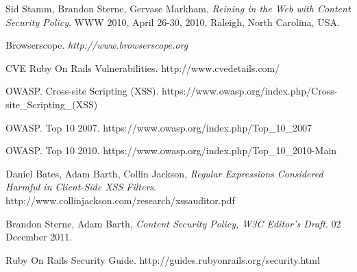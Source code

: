\documentclass[10pt, conference, compsocconf]{IEEEtran}
\begin{document}
\begin{thebibliography}{1}
Sid Stamm, Brandon Sterne, Gervase Markham, \emph{Reining in the Web with Content Security Policy}. WWW 2010, April 26-30, 2010, Raleigh, North Carolina, USA.

Browserscope. \emph{http://www.browserscope.org}

CVE Ruby On Rails Vulnerabilities. http://www.cvedetails.com/

OWASP. Cross-site Scripting (XSS). https://www.owasp.org/index.php/Cross-site\_Scripting\_(XSS)

OWASP. Top 10 2007.  https://www.owasp.org/index.php/Top\_10\_2007

OWASP. Top 10 2010. https://www.owasp.org/index.php/Top\_10\_2010-Main

Daniel Bates, Adam Barth, Collin Jackson, \emph{Regular Expressions Considered Harmful in
Client-Side XSS Filters}. http://www.collinjackson.com/research/xssauditor.pdf

Brandon Sterne, Adam Barth, \emph{Content Security Policy, W3C Editor's Draft}. 02 December 2011.

Ruby On Rails Security Guide. http://guides.rubyonrails.org/security.html

\end{thebibliography}
\end{document}
